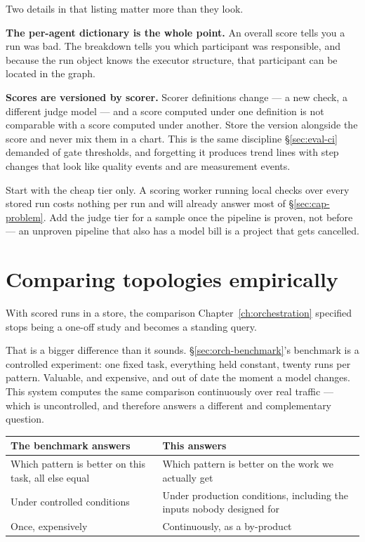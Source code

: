 Two details in that listing matter more than they look.

\textbf{The per-agent dictionary is the whole point.} An overall score tells you a
run was bad. The breakdown tells you which participant was responsible, and
because the run object knows the executor structure, that participant can be
located in the graph.

\textbf{Scores are versioned by scorer.} Scorer definitions change --- a new
check, a different judge model --- and a score computed under one definition is
not comparable with a score computed under another. Store the version alongside
the score and never mix them in a chart. This is the same discipline
\S\ref{sec:eval-ci} demanded of gate thresholds, and forgetting it produces trend
lines with step changes that look like quality events and are measurement events.

\begin{note}
Start with the cheap tier only. A scoring worker running local checks over every
stored run costs nothing per run and will already answer most of
\S\ref{sec:cap-problem}. Add the judge tier for a sample once the pipeline is
proven, not before --- an unproven pipeline that also has a model bill is a
project that gets cancelled.
\end{note}

\section{Comparing topologies empirically}
\label{sec:cap-compare}

With scored runs in a store, the comparison Chapter~\ref{ch:orchestration}
specified stops being a one-off study and becomes a standing query.

That is a bigger difference than it sounds. \S\ref{sec:orch-benchmark}'s
benchmark is a controlled experiment: one fixed task, everything held constant,
twenty runs per pattern. Valuable, and expensive, and out of date the moment a
model changes. This system computes the same comparison continuously over real
traffic --- which is uncontrolled, and therefore answers a different and
complementary question.

\begin{center}
\small
\begin{tabularx}{\linewidth}{@{}XX@{}}
\toprule
\textbf{The benchmark answers} & \textbf{This answers} \\
\midrule
Which pattern is better on this task, all else equal & Which pattern is better
on the work we actually get \\[4pt]
Under controlled conditions & Under production conditions, including the inputs
nobody designed for \\[4pt]
Once, expensively & Continuously, as a by-product \\
\bottomrule
\end{tabularx}
\end{center}

